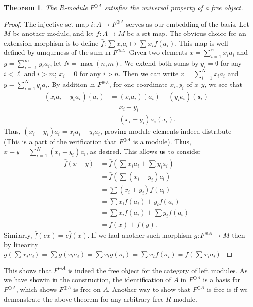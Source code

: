\documentclass[12pt]{article}
\theoremstyle{definition}
\theoremstyle{plain}
\newtheorem{theorem}{Theorem}[section]
\numberwithin{equation}{section}
\theoremstyle{definition}
\begin{document}
\begin{theorem}
The $ R $-module $ F^{\oplus A} $ satisfies the universal property of a free object.
\end{theorem}

\begin{proof}
The injective set-map $ i : A \to F^{\oplus A} $ serves as our embedding of the basis. Let $ M $ be another module, and let $ f : A \to M $ be a set-map. The obvious choice for an extension morphism is to define $ \bar{f} : \sum x_i a_i \mapsto \sum x_i f(a_i) $. This map is well-defined by uniqueness of the sum in $ F^{\oplus A} $. Given two elements $ x = \sum_{i = 1}^n x_i a_i $ and $ y = \sum_{i = \ell}^m y_i a_i $, let $ N = \max(n, m) $. We extend both sums by $ y_i = 0 $ for any $ i < \ell$ and $ i > m $; $ x_i = 0 $ for any $ i > n $. Then we can write $ x = \sum_{i = 1}^N x_i a_i $ and $ y = \sum_{i = 1}^N y_i a_i $. By addition in $ F^{\oplus A} $, for one coordinate $x_i, y_i$ of $ x, y $, we see that 
\begin{align*}
	(x_i a_i + y_i a_i)(a_i) &= (x_i a_i)(a_i) + (y_i a_i)(a_i)\\
	&= x_i + y_i\\
	&= (x_i + y_i) a_i(a_i).
\end{align*}
Thus, $ (x_i + y_i)a_i = x_i a_i + y_i a_i $, proving module elements indeed distribute (This is a part of the verification that $ F^{\oplus A} $ is a module). Thus, $ x + y = \sum_{i = 1}^N (x_i + y_i) a_i $, as desired. This allows us to consider 
\begin{align*}
	\bar{f}(x + y) &= \bar{f}(\sum x_i a_i + \sum y_i a_i)\\
	&= \bar{f}(\sum (x_i + y_i) a_i)\\
	&= \sum (x_i + y_i) f(a_i)\\
	&= \sum x_i f(a_i) + y_i f(a_i)\\
	&= \sum x_i f(a_i) + \sum y_i f(a_i)\\
	&= \bar{f}(x) + \bar{f}(y).
\end{align*}
Similarly, $ \bar{f}(c x) = c \bar{f}(x) $. If we had another such morphism $ g : F^{\oplus A} \to M $ then by linearity $ g(\sum x_i a_i) = \sum g(x_i a_i) = \sum x_i g(a_i) = \sum x_i f(a_i) = \bar{f}(\sum x_i a_i) $.
\end{proof}

This shows that $ F^{\oplus A} $ is indeed the free object for the category of left modules. As we have showin in the construction, the identification of $ A $ in $ F^{\oplus A} $ is a basis for $ F^{\oplus A} $, which shows $ F^{\oplus A} $ is free on $ A $. Another way to show that $ F^{\oplus A} $ is free is if we demonstrate the above theorem for any arbitrary free $ R $-module.
\end{document}
